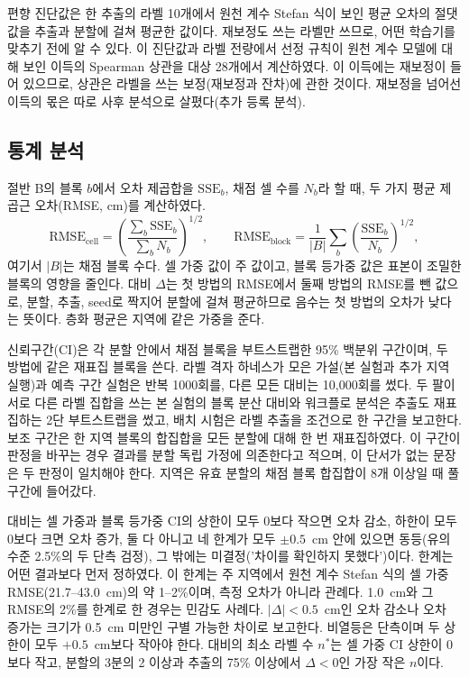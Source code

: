 편향 진단값은 한 추출의 라벨 10개에서 원천 계수 Stefan 식이 보인 평균 오차의 절댓값을 추출과 분할에 걸쳐 평균한 값이다. 재보정도 쓰는 라벨만 쓰므로, 어떤 학습기를 맞추기 전에 알 수 있다. 이 진단값과 라벨 전량에서 선정 규칙이 원천 계수 모델에 대해 보인 이득의 Spearman 상관을 대상 28개에서 계산하였다. 이 이득에는 재보정이 들어 있으므로, 상관은 라벨을 쓰는 보정(재보정과 잔차)에 관한 것이다. 재보정을 넘어선 이득의 몫은 따로 사후 분석으로 살폈다(추가 등록 분석).

\subsection{통계 분석}\label{sec:m-stats}

절반 B의 블록 $b$에서 오차 제곱합을 $\mathrm{SSE}_b$, 채점 셀 수를 $N_b$라 할 때, 두 가지 평균 제곱근 오차(RMSE, cm)를 계산하였다.
\begin{equation}
\mathrm{RMSE}_{\mathrm{cell}} = \left(\frac{\sum_b \mathrm{SSE}_b}{\sum_b N_b}\right)^{1/2}, \qquad \mathrm{RMSE}_{\mathrm{block}} = \frac{1}{|B|}\sum_b \left(\frac{\mathrm{SSE}_b}{N_b}\right)^{1/2},
\label{eq:rmse}
\end{equation}
여기서 $|B|$는 채점 블록 수다. 셀 가중 값이 주 값이고, 블록 등가중 값은 표본이 조밀한 블록의 영향을 줄인다. 대비 $\Delta$는 첫 방법의 RMSE에서 둘째 방법의 RMSE를 뺀 값으로, 분할, 추출, seed로 짝지어 분할에 걸쳐 평균하므로 음수는 첫 방법의 오차가 낮다는 뜻이다. 층화 평균은 지역에 같은 가중을 준다.

신뢰구간(CI)은 각 분할 안에서 채점 블록을 부트스트랩한 95\% 백분위 구간이며, 두 방법에 같은 재표집 블록을 쓴다. 라벨 격자 하네스가 모은 가설(본 실험과 추가 지역 실행)과 예측 구간 실험은 반복 1000회를, 다른 모든 대비는 10,000회를 썼다. 두 팔이 서로 다른 라벨 집합을 쓰는 본 실험의 블록 분산 대비와 워크플로 분석은 추출도 재표집하는 2단 부트스트랩을 썼고, 배치 시험은 라벨 추출을 조건으로 한 구간을 보고한다. 보조 구간은 한 지역 블록의 합집합을 모든 분할에 대해 한 번 재표집하였다. 이 구간이 판정을 바꾸는 경우 결과를 분할 독립 가정에 의존한다고 적으며, 이 단서가 없는 문장은 두 판정이 일치해야 한다. 지역은 유효 분할의 채점 블록 합집합이 8개 이상일 때 풀 구간에 들어갔다.

대비는 셀 가중과 블록 등가중 CI의 상한이 모두 0보다 작으면 오차 감소, 하한이 모두 0보다 크면 오차 증가, 둘 다 아니고 네 한계가 모두 $\pm 0.5$~cm 안에 있으면 동등(유의수준 2.5\%의 두 단측 검정\cite{Schuirmann1987}), 그 밖에는 미결정('차이를 확인하지 못했다')이다. 한계는 어떤 결과보다 먼저 정하였다. 이 한계는 주 지역에서 원천 계수 Stefan 식의 셀 가중 RMSE(21.7--43.0~cm)의 약 1--2\%이며, 측정 오차가 아니라 관례다. 1.0~cm와 그 RMSE의 2\%를 한계로 한 경우는 민감도 사례다. $|\Delta| < 0.5$~cm인 오차 감소나 오차 증가는 크기가 0.5~cm 미만인 구별 가능한 차이로 보고한다. 비열등은 단측이며 두 상한이 모두 $+0.5$~cm보다 작아야 한다. 대비의 최소 라벨 수 $n^{*}$는 셀 가중 CI 상한이 0보다 작고, 분할의 3분의 2 이상과 추출의 75\% 이상에서 $\Delta < 0$인 가장 작은 $n$이다.

